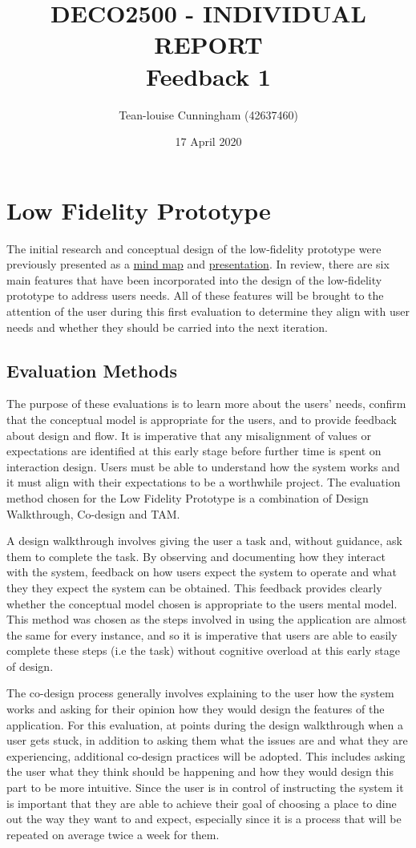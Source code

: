 \documentclass[a4 paper, 12pt]{article}
\title{DECO2500 - INDIVIDUAL REPORT \\ Feedback 1}
\author{Tean-louise Cunningham (42637460)}
\date{17 April 2020}
\begin{document}
\section{Low Fidelity Prototype}
The initial research and conceptual design of the low-fidelity prototype were previously presented as a \href{run:../MindMap/MindMap.pdf}{mind map} and \href{https://youtu.be/BRX7kF7ynSQ}{presentation}. In review, there are six main features that have been incorporated into the design of the low-fidelity prototype to address users needs. All of these features will be brought to the attention of the user during this first evaluation to determine they align with user needs and whether they should be carried into the next iteration.

\subsection{Evaluation Methods}
The purpose of these evaluations is to learn more about the users' needs, confirm that the conceptual model is appropriate for the users, and to provide feedback about design and flow. It is imperative that any misalignment of values or expectations are identified at this early stage before further time is spent on interaction design. Users must be able to understand how the system works and it must align with their expectations to be a worthwhile project. The evaluation method chosen for the Low Fidelity Prototype is a combination of Design Walkthrough, Co-design and TAM.

A design walkthrough involves giving the user a task and, without guidance, ask them to complete the task. By observing and documenting how they interact with the system, feedback on how users expect the system to operate and what they they expect the system can be obtained. This feedback provides clearly whether the conceptual model chosen is appropriate to the users mental model. This method was chosen as the steps involved in using the application are almost the same for every instance, and so it is imperative that users are able to easily complete these steps (i.e the task) without cognitive overload at this early stage of design.

The co-design process generally involves explaining to the user how the system works and asking for their opinion how they would design the features of the application. For this evaluation, at points during the design walkthrough when a user gets stuck, in addition to asking them what the issues are and what they are experiencing, additional co-design practices will be adopted. This includes asking the user what they think should be happening and how they would design this part to be more intuitive. Since the user is in control of instructing the system it is important that they are able to achieve their goal of choosing a place to dine out the way they want to and expect, especially since it is a process that will be repeated on average twice a week for them. 
\end{document}
